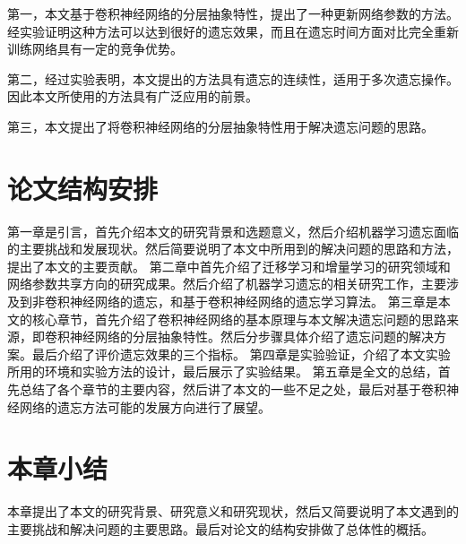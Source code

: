 第一，本文基于卷积神经网络的分层抽象特性，提出了一种更新网络参数的方法。经实验证明这种方法可以达到很好的遗忘效果，而且在遗忘时间方面对比完全重新训练网络具有一定的竞争优势。

第二，经过实验表明，本文提出的方法具有遗忘的连续性，适用于多次遗忘操作。因此本文所使用的方法具有广泛应用的前景。

第三，本文提出了将卷积神经网络的分层抽象特性用于解决遗忘问题的思路。

\section{论文结构安排}
第一章是引言，首先介绍本文的研究背景和选题意义，然后介绍机器学习遗忘面临的主要挑战和发展现状。然后简要说明了本文中所用到的解决问题的思路和方法，提出了本文的主要贡献。
第二章中首先介绍了迁移学习和增量学习的研究领域和网络参数共享方向的研究成果。然后介绍了机器学习遗忘的相关研究工作，主要涉及到非卷积神经网络的遗忘，和基于卷积神经网络的遗忘学习算法。
第三章是本文的核心章节，首先介绍了卷积神经网络的基本原理与本文解决遗忘问题的思路来源，即卷积神经网络的分层抽象特性。然后分步骤具体介绍了遗忘问题的解决方案。最后介绍了评价遗忘效果的三个指标。
第四章是实验验证，介绍了本文实验所用的环境和实验方法的设计，最后展示了实验结果。
第五章是全文的总结，首先总结了各个章节的主要内容，然后讲了本文的一些不足之处，最后对基于卷积神经网络的遗忘方法可能的发展方向进行了展望。
\section{本章小结}
本章提出了本文的研究背景、研究意义和研究现状，然后又简要说明了本文遇到的主要挑战和解决问题的主要思路。最后对论文的结构安排做了总体性的概括。
